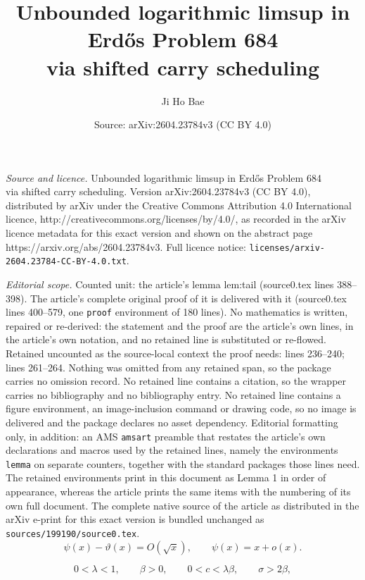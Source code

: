 \documentclass[10pt,a4paper]{amsart}
\title{Unbounded logarithmic limsup in Erd\H{o}s Problem 684\\ via shifted carry scheduling}
\author{Ji Ho Bae}
\date{Source: arXiv:2604.23784v3 (CC BY 4.0)}
\begin{document}
\maketitle

\noindent\emph{Source and licence.} Unbounded logarithmic limsup in Erd\H{o}s Problem 684\\ via shifted carry scheduling. Version arXiv:2604.23784v3 (CC BY 4.0), distributed by arXiv under the Creative Commons Attribution 4.0 International licence, http://creativecommons.org/licenses/by/4.0/, as recorded in the arXiv licence metadata for this exact version and shown on the abstract page https://arxiv.org/abs/2604.23784v3. Full licence notice: \texttt{licenses/arxiv-2604.23784-CC-BY-4.0.txt}.\par\smallskip

\noindent\textit{Editorial scope.} Counted unit: the article's lemma lem:tail (source0.tex lines 388--398). The article's complete original proof of it is delivered with it (source0.tex lines 400--579, one \texttt{proof} environment of 180 lines). No mathematics is written, repaired or re-derived: the statement and the proof are the article's own lines, in the article's own notation, and no retained line is substituted or re-flowed.  Retained uncounted as the source-local context the proof needs: lines 236--240; lines 261--264.  Nothing was omitted from any retained span, so the package carries no omission record.  No retained line contains a citation, so the wrapper carries no bibliography and no bibliography entry.  No retained line contains a figure environment, an image-inclusion command or drawing code, so no image is delivered and the package declares no asset dependency.  Editorial formatting only, in addition: an AMS \texttt{amsart} preamble that restates the article's own declarations and macros used by the retained lines, namely the environments \texttt{lemma} on separate counters, together with the standard packages those lines need.  The retained environments print in this document as Lemma 1 in order of appearance, whereas the article prints the same items with the numbering of its own full document.  The complete native source of the article as distributed in the arXiv e-print for this exact version is bundled unchanged as \texttt{sources/199190/source0.tex}.
\begin{equation}\label{eq:psi-theta}
 \psi(x)-\vartheta(x)=O(\sqrt{x}),
 \qquad
 \psi(x)=x+o(x).
\end{equation}

\begin{equation}\label{eq:param-basic}
 0<\lambda<1,\qquad \beta>0,\qquad
 0<c<\lambda\beta,\qquad \sigma>2\beta,
\end{equation}
\end{document}
